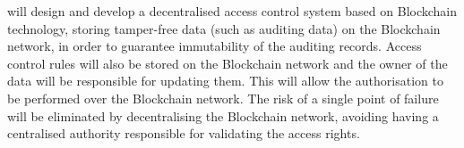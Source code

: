 \begin{Workpackage}{\thewpno}
\begin{Task}
\TaskResults{%
\ref{del:auth1},
\ref{del:auth2},
\ref{del:auth3}
}
\TaskHeader{}
\theTask{} will design and develop a decentralised access control system based on Blockchain technology, storing tamper-free data (such as auditing data) on the Blockchain network, in order to guarantee immutability of the auditing records. Access control rules will also be stored on the Blockchain network and the owner of the data will be responsible for updating them. This will allow the authorisation to be performed over the Blockchain network.
The risk of a single point of failure will be eliminated by decentralising the Blockchain network, avoiding having a centralised authority responsible for validating the access rights. %

\end{Task}
\end{Workpackage}
